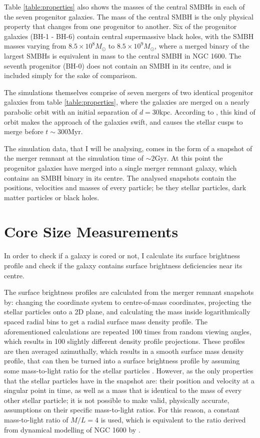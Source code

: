 \documentclass[english, oneside]{HYgradu}
\begin{document}
Table \ref{table:properties} also shows the masses of the central SMBHs in each of the seven progenitor galaxies. The mass of the central SMBH is the only physical property that changes from one progenitor to another. Six of the progenitor galaxies (BH-1 - BH-6) contain central supermassive black holes, with the SMBH masses varying from $8.5 \times 10^8 M_\odot$ to $8.5 \times 10^9 M_\odot$, where a merged binary of the largest SMBHs is equivalent in mass to the central SMBH in NGC 1600. The seventh progenitor (BH-0) does not contain an SMBH in its centre, and is included simply for the sake of comparison.

The simulations themselves comprise of seven mergers of two identical progenitor galaxies from table \ref{table:properties}, where the galaxies are merged on a nearly parabolic orbit with an initial separation of $d = 30 \mathrm{kpc}$. According to \cite{Rantala2018}, this kind of orbit makes the approach of the galaxies swift, and causes the stellar cusps to merge before $t \sim 300 \mathrm{Myr}$.

The simulation data, that I will be analysing, comes in the form of a snapshot of the merger remnant at the simulation time of $\sim 2 \mathrm{Gyr}$. At this point the progenitor galaxies have merged into a single merger remnant galaxy, which contains an SMBH binary in its centre. The analysed snapshots contain the positions, velocities and masses of every particle; be they stellar particles, dark matter particles or black holes.

\section{Core Size Measurements}

In order to check if a galaxy is cored or not, I calculate its surface brightness profile and check if the galaxy contains surface brightness deficiencies near its centre.

The surface brightness profiles are calculated from the merger remnant snapshots by: changing the coordinate system to centre-of-mass coordinates, projecting the stellar particles onto a 2D plane, and calculating the mass inside logarithmically spaced radial bins to get a radial surface mass density profile. The aforementioned calculations are repeated 100 times from random viewing angles, which results in 100 slightly different density profile projections. These profiles are then averaged azimuthally, which results in a smooth surface mass density profile, that can then be turned into a surface brightness profile by assuming some mass-to-light ratio for the stellar particles \citep{Rantala2018}. However, as the only properties that the stellar particles have in the snapshot are: their position and velocity at a singular point in time, as well as a mass that is identical to the mass of every other stellar particle; it is not possible to make valid, physically accurate, assumptions on their specific mass-to-light ratios. For this reason, a constant mass-to-light ratio of $M/L = 4$ is used, which is equivalent to the ratio derived from dynamical modelling of NGC 1600 by \cite{Thomas2016}.
\end{document}
